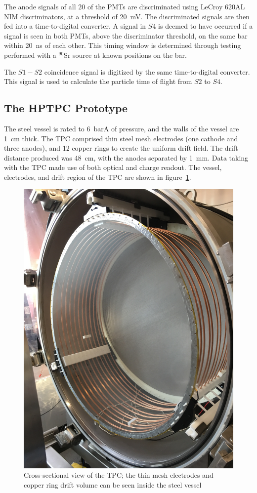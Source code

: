 The anode signals of all 20 of the PMTs are discriminated using LeCroy 620AL NIM discriminators, at a threshold of 20~mV.
The discriminated signals are then fed into a time-to-digital converter. A signal in $\mathit{S4}$ is deemed to have occurred if a signal is seen in both PMTs, above the discriminator threshold, on the same bar within 20~ns of each other. 
This timing window is determined through testing performed with a $^{90}$Sr source at known positions on the bar.

The $\mathit{S1-S2}$ coincidence signal is digitized by the same time-to-digital converter. This signal is used to calculate the particle time of flight from $\mathit{S2}$ to $\mathit{S4}$.

\subsection{The HPTPC Prototype}
The steel vessel is rated to 6~barA of pressure, and the walls of the vessel are 1~cm thick.
The TPC comprised thin steel mesh electrodes (one cathode and three anodes), and 12 copper rings to create the uniform drift field.
The drift distance produced was 48~cm, with the anodes separated by 1~mm. Data taking with the TPC made use of both optical and charge readout.
The vessel, electrodes, and drift region of the TPC are shown in figure~\ref{fig:TPC}.

\begin{figure}
  \centering
  \includegraphics[width=0.6\linewidth]{files/Figures/IMG_1194.jpg}
  \caption{Cross-sectional view of the TPC; the thin mesh electrodes and copper ring drift volume can be seen inside the steel vessel}
  \label{fig:TPC}
\end{figure}

